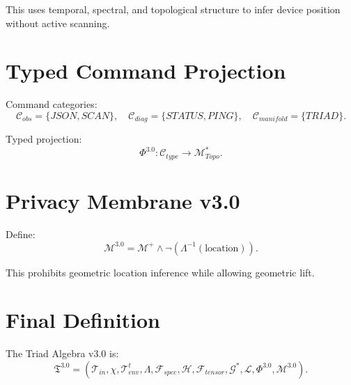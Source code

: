 \documentclass[11pt]{article}
\begin{document}
This uses temporal, spectral, and topological structure to infer device position
without active scanning.

\section{Typed Command Projection}
Command categories:
\[
\mathcal{C}_{obs} = \{JSON, SCAN\},\quad
\mathcal{C}_{diag} = \{STATUS, PING\},\quad
\mathcal{C}_{manifold} = \{TRIAD\}.
\]

Typed projection:
\[
\Phi^{3.0} : \mathcal{C}_{type} \to \mathcal{M}_{Topo}^{\ast}.
\]

\section{Privacy Membrane v3.0}
Define:
\[
\mathcal{M}^{3.0}
= \mathcal{M}^{+} \land \neg(\Lambda^{-1}(\text{location})).
\]

This prohibits geometric location inference while allowing geometric lift.

\section{Final Definition}
The Triad Algebra v3.0 is:
\[
\boxed{
\mathfrak{T}^{3.0} =
(\mathcal{T}_{in},\chi,\mathcal{T}_{env}^{t},\Lambda,
\mathcal{F}_{spec},\mathcal{H},\mathcal{F}_{tensor},
\mathcal{G}^{\ast},\mathcal{L},\Phi^{3.0},\mathcal{M}^{3.0})
}.
\]
\end{document}
